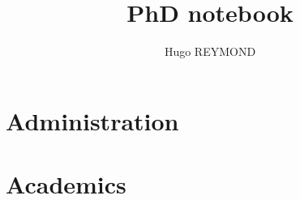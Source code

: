 \documentclass{article}
\begin{document}
	
	\title{PhD notebook}
	\author{Hugo REYMOND}
	\date{}  %
	
	
	\maketitle %
	\thispagestyle{fancy}
	
	
	
	\tableofcontents\thispagestyle{fancy}
	\newpage
	\listoffigures\thispagestyle{fancy}
	\listoftables\thispagestyle{fancy}
	
	
	\newpage



% 

% 

% 

% 

% 

% 


\section{Administration}




\section{Academics}

\todo{$\succ$ --------------------}

\end{document}
